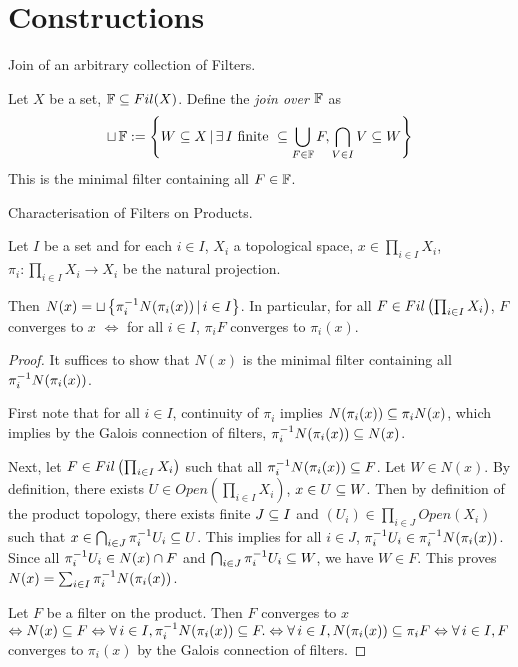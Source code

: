\documentclass[main.tex]{subfiles}
\begin{document}
\section{Constructions}

\begin{dfn} Join of an arbitrary collection of Filters.
  
  Let $X$ be a set, $\mathbb{F} \subseteq Fil(X)$.
  Define the \emph{join over $\mathbb{F}$} as 
  \[
    \sqcup\,\mathbb{F} := \left\{
      W \subseteq X \,|\, \exists\, I\text{ finite } \subseteq \bigcup_{F \in \mathbb{F}} F,
      \bigcap_{V \in I} V \subseteq W
    \right\}
  \]
  This is the minimal filter containing all $F \in \mathbb{F}$.
\end{dfn}

\begin{thm} Characterisation of Filters on Products. 
  
  Let $I$ be a set and for each $i \in I$, $X_i$ a topological space,
  $x \in \prod_{i\in I} X_i$,
  $\pi_i : \prod_{i \in I} X_i \to X_i$ be the natural projection.

  Then $N(x) = \sqcup\left\{\pi_i^{-1} N(\pi_i(x)) \,|\, i \in I\right\}$.
  In particular, 
  for all $F \in Fil\left(\prod_{i\in I} X_i\right)$, 
  $F$ converges to $x$ $\iff$ 
  for all $i \in I$, $\pi_i F$ converges to $\pi_i(x)$.
\end{thm}
\begin{proof}
  It suffices to show that $N(x)$ is the minimal filter containing
  all $\pi_i^{-1} N(\pi_i(x))$.

  First note that for all $i \in I$, continuity of $\pi_i$ implies 
  $N(\pi_i(x)) \subseteq \pi_iN(x)$,
  which implies by the Galois connection of filters, 
  $\pi_i^{-1} N(\pi_i(x)) \subseteq N(x)$.

  Next, let $F \in Fil\left(\prod_{i\in I}X_i\right)$ such that 
  all $\pi_i^{-1} N(\pi_i(x)) \subseteq F$.
  Let $W \in N(x)$.
  By definition, 
  there exists $U \in Open(\prod_{i\in I}X_i)$, $x \in U \subseteq W$.
  Then by definition of the product topology, 
  there exists finite $J \subseteq I$ and $(U_i) \in \prod_{i \in J} Open(X_i)$
  such that $x \in \bigcap_{i \in J} \pi_i^{-1} U_i \subseteq U$.
  This implies for all $i\in J$, $\pi_i^{-1} U_i \in \pi_i^{-1} N(\pi_i(x))$.
  Since all $\pi_i^{-1} U_i \in N(x) \cap F$
  and $\bigcap_{i\in J}\pi_i^{-1} U_i \subseteq W$,
  we have $W \in F$.
  This proves $N(x) = \sum_{i \in I} \pi_i^{-1} N(\pi_i(x))$.
  
  Let $F$ be a filter on the product.
  Then $F$ converges to $x$ $\Leftrightarrow N(x) \subseteq F \Leftrightarrow 
  \forall\, i\in I, \pi_i^{-1} N(\pi_i(x)) \subseteq F. \Leftrightarrow 
  \forall\, i\in I, N(\pi_i(x)) \subseteq \pi_i F \Leftrightarrow
  \forall\, i \in I, F$ converges to $\pi_i(x)$ 
  by the Galois connection of filters.  
\end{proof}
\end{document}
